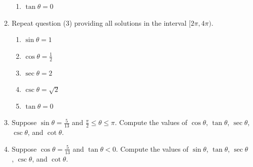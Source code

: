 \documentclass[12pt]{article}
\newif\ifans
\begin{document}
\begin{enumerate}
\begin{enumerate}
\item $\tan{\theta}=0$

\ifans\fbox{$\theta=0$ or $\theta=\pi$}\fi

\end{enumerate}

\item Repeat question (3) providing all solutions in the interval $[2\pi,4\pi)$.

\begin{enumerate}

\item $\sin{\theta}=1$

\ifans\fbox{$\theta=\frac{5\pi}{2}$}\fi

\item $\cos{\theta}=\frac{1}{2}$

\ifans\fbox{$\theta=\frac{7\pi}{3}$ or $\theta=\frac{11\pi}{3}$}\fi

\item $\sec{\theta}=2$

\ifans\fbox{$\theta=\frac{7\pi}{3}$ or $\theta=\frac{11\pi}{3}$}\fi

\item $\csc{\theta}=\sqrt{2}$

\ifans\fbox{$\theta=\frac{9\pi}{4}$ or $\theta=\frac{11\pi}{4}$}\fi

\item $\tan{\theta}=0$

\ifans\fbox{$\theta=2\pi$ or $\theta=3\pi$}\fi

\end{enumerate}

\item Suppose $\sin{\theta}=\frac{5}{13}$ and $\frac{\pi}{2} \leq \theta \leq \pi$.  Compute the values of $\cos{\theta}$, $\tan{\theta}$, $\sec{\theta}$, $\csc{\theta}$, and $\cot{\theta}$.

\ifans\fbox{$\cos{\theta}=-\frac{12}{13}$, $\tan{\theta}=-\frac{5}{12}$, $\sec{\theta}=-\frac{13}{12}$, $\csc{\theta}=\frac{13}{5}$, and $\cot{\theta}=-\frac{12}{5}$} \fi

\item Suppose $\cos{\theta}=\frac{5}{13}$ and $\tan{\theta}<0$.  Compute the values of $\sin{\theta}$, $\tan{\theta}$, $\sec{\theta}$, $\csc{\theta}$, and $\cot{\theta}$.

\ifans\fbox{$\sin{\theta}=-\frac{12}{13}$, $\tan{\theta}=-\frac{12}{5}$, $\sec{\theta}=\frac{13}{5}$, $\csc{\theta}=-\frac{13}{12}$, and $\cot{\theta}=-\frac{5}{12}$} \fi


\end{enumerate}
\end{document}
